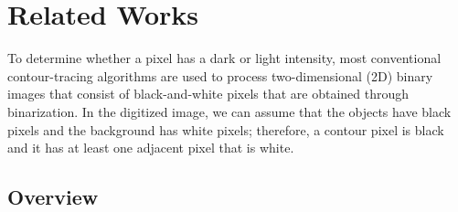 
\section{Related Works}


To determine whether a pixel has a dark or light intensity, most conventional contour-tracing algorithms are used to process two-dimensional (2D) binary images that consist of black-and-white pixels that are obtained through binarization. In the digitized image, we can assume that the objects have black pixels and the background has white pixels; therefore, a contour pixel is black and it has at least one adjacent pixel that is white.

\subsection{Overview}

